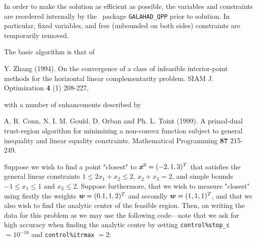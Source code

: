 \documentclass{galahad}
\begin{document}
In order to make the solution as efficient as possible, the 
variables and constraints are reordered internally
by the \galahad\ package {\tt GALAHAD\_QPP} prior to solution. 
In particular, fixed variables, and 
free (unbounded on both sides) constraints are temporarily removed.
\vspace*{1mm}

\galreferences
\vspace*{1mm}

\noindent
The basic algorithm is that of
\vspace*{1mm}

\noindent
Y. Zhang (1994).
On the convergence of a class of infeasible interior-point methods for the
horizontal linear complementarity problem.
SIAM J. Optimization {\bf 4} (1) 208-227,
\vspace*{1mm}

\noindent
with a number of enhancements described by
\vspace*{1mm}

\noindent
A. R. Conn, N. I. M. Gould, D. Orban and Ph. L. Toint (1999).
A primal-dual trust-region algorithm for minimizing a non-convex 
function subject to general inequality and linear equality constraints.
Mathematical Programming {\bf 87} 215-249.


\galexample
Suppose we wish to find a point "closest" to
${\bm{x}}^{0}  =  ( -2, 1, 3 )^{T}$
that satisfies the general linear constraints
$1 \leq  2 x_{1}  +  x_{2}  \leq  2$, 
$x_{2}  +  x_{3}  =  2$, and simple bounds
$-1  \leq  x_{1}  \leq  1$ and $x_{3}  \leq  2$.
Suppose furthermore, that we wish to measure "closest" using
firstly the weights ${\bm{w}}  =  ( 0.1, 1, 2 )^{T}$
and secondly ${\bm{w}}  =  ( 1, 1, 1 )^{T}$, and that we also
wish to find the analytic center of the feasible region.
Then, on writing the data for this problem as
we may use the following code---note that we ask for high accuracy
when finding the analytic center by setting
{\tt control\%stop\_c} $= 10^{-16}$ and {\tt control\%itrmax} $= 2$:
\end{document}
